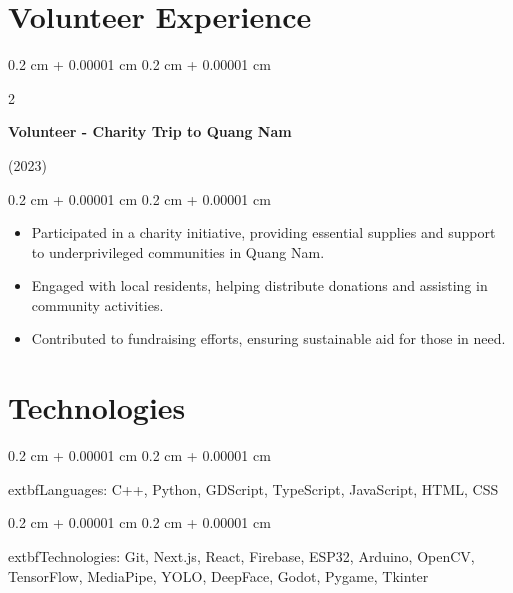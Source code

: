 \documentclass[10pt, letterpaper]{article}
\newenvironment{highlights}{
    \begin{itemize}[
        topsep=0.10 cm,
        parsep=0.10 cm,
        partopsep=0pt,
        itemsep=0pt,
        leftmargin=0.4 cm + 10pt
    ]
}{
    \end{itemize}
} %
\newenvironment{onecolentry}{
    \begin{adjustwidth}{
        0.2 cm + 0.00001 cm
    }{
        0.2 cm + 0.00001 cm
    }
}{
    \end{adjustwidth}
} %
\newenvironment{twocolentry}[2][]{
    \onecolentry
    \def\secondColumn{#2}
    \setcolumnwidth{\fill, 4.5 cm}
    \begin{paracol}{2}
}{
    \switchcolumn \raggedleft \secondColumn
    \end{paracol}
    \endonecolentry
} %
\begin{document}
\vspace{0.2 cm}

\section{Volunteer Experience}

    \begin{twocolentry}{(2023)}
    \textbf{Volunteer - Charity Trip to Quang Nam}
\end{twocolentry}

\vspace{0.10 cm}
\begin{onecolentry}
    \begin{highlights}
        \item Participated in a charity initiative, providing essential supplies and support to underprivileged communities in Quang Nam.
        \item Engaged with local residents, helping distribute donations and assisting in community activities.
        \item Contributed to fundraising efforts, ensuring sustainable aid for those in need.
    \end{highlights}
\end{onecolentry}
    
    
    
    \section{Technologies}
        
        \begin{onecolentry}
            	extbf{Languages:} C++, Python, GDScript, TypeScript, JavaScript, HTML, CSS
        \end{onecolentry}

        \vspace{0.2 cm}

        \begin{onecolentry}
            	extbf{Technologies:} Git, Next.js, React, Firebase, ESP32, Arduino, OpenCV, TensorFlow, MediaPipe, YOLO, DeepFace, Godot, Pygame, Tkinter
        \end{onecolentry}


    
\end{document}

